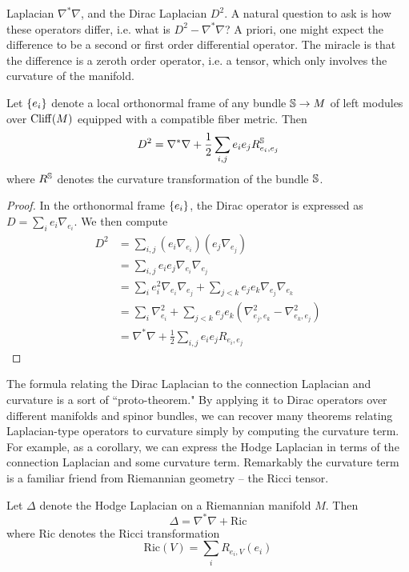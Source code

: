 Laplacian $\nabla^*\nabla$, and the Dirac Laplacian $D^2$. A natural question
to ask is how these operators differ, i.e. what is $D^2 - \nabla^*\nabla$? A priori,
one might expect the difference to be a second or first order differential operator.
The miracle is that the difference is a zeroth order operator, i.e. a tensor, which
only involves the curvature of the manifold.
%
\begin{thm}
Let $\set{e_i}$ denote a local orthonormal frame of any bundle $\S \to M$ of left
modules over $\Cliff(M)$ equipped with a compatible fiber metric. Then
\[
D^2 = \nabla^*\nabla + \frac{1}{2}\sum_{i, j} e_i e_j R^\S_{e_i, e_j}
\]
where $R^\S$ denotes the curvature transformation of the bundle $\S$.
\end{thm}
%
\begin{proof}
In the orthonormal frame $\set{e_i}$, the Dirac operator is expressed as
$D = \sum_i e_i\nabla_{e_i}$. We then compute
\begin{align*}
D^2 &= \sum_{i,j}(e_i\nabla_{e_i})(e_j\nabla_{e_j}) \\
&= \sum_{i,j} e_ie_j\nabla_{e_i}\nabla_{e_j} \\
&= \sum_i e_i^2\nabla_{e_i}\nabla_{e_j} + \sum_{j < k} e_j e_k\nabla_{e_j}\nabla_{e_k} \\
&= \sum_i \nabla^2_{e_i}
+ \sum_{j < k} e_je_k (\nabla^2_{e_j, e_k} - \nabla^2_{e_k, e_j}) \\
&= \nabla^*\nabla + \frac{1}{2}\sum_{i, j} e_i e_j R_{e_i, e_j}
\end{align*}
\end{proof}
%
The formula relating the Dirac Laplacian to the connection Laplacian and curvature
is a sort of ``proto-theorem." By applying it to Dirac operators over different
manifolds and spinor bundles, we can recover many theorems relating Laplacian-type
operators to curvature simply by computing the curvature term. For example,
as a corollary, we can express the Hodge Laplacian in terms of the connection Laplacian
and some curvature term. Remarkably the curvature term is a familiar friend from
Riemannian geometry -- the Ricci tensor.
%
\begin{cor}
Let $\Delta$ denote the Hodge Laplacian on a Riemannian manifold $M$. Then
\[
\Delta = \nabla^*\nabla + \mathrm{Ric}
\]
where $\mathrm{Ric}$ denotes the Ricci transformation
\[
\mathrm{Ric}(V) = \sum_{i} R_{e_i,V}(e_i)
\]
\end{cor}
%
